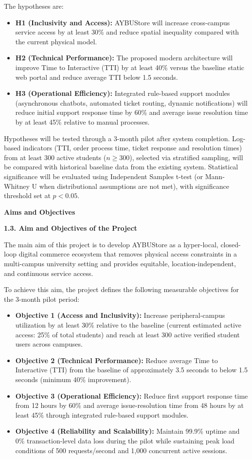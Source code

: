 \documentclass[10pt,a4paper]{article}
\newcommand{\subhead}[1]{\vspace{0.8em}\noindent\textbf{\fontsize{10}{11}\selectfont #1}\par\vspace{0.3em}}
\begin{document}
The hypotheses are:
\begin{itemize}
    \item \textbf{H1 (Inclusivity and Access):} AYBUStore will increase cross-campus service access by at least 30\% and reduce spatial inequality compared with the current physical model.
    \item \textbf{H2 (Technical Performance):} The proposed modern architecture will improve Time to Interactive (TTI) by at least 40\% versus the baseline static web portal and reduce average TTI below 1.5 seconds.
    \item \textbf{H3 (Operational Efficiency):} Integrated rule-based support modules (asynchronous chatbots, automated ticket routing, dynamic notifications) will reduce initial support response time by 60\% and average issue resolution time by at least 45\% relative to manual processes.
\end{itemize}

Hypotheses will be tested through a 3-month pilot after system completion. Log-based indicators (TTI, order process time, ticket response and resolution times) from at least 300 active students ($n \geq 300$), selected via stratified sampling, will be compared with historical baseline data from the existing system. Statistical significance will be evaluated using Independent Samples t-test (or Mann-Whitney U when distributional assumptions are not met), with significance threshold set at $p < 0.05$.

\subhead{Aims and Objectives}
\textbf{1.3. Aim and Objectives of the Project}

The main aim of this project is to develop AYBUStore as a hyper-local, closed-loop digital commerce ecosystem that removes physical access constraints in a multi-campus university setting and provides equitable, location-independent, and continuous service access.

To achieve this aim, the project defines the following measurable objectives for the 3-month pilot period:
\begin{itemize}
    \item \textbf{Objective 1 (Access and Inclusivity):} Increase peripheral-campus utilization by at least 30\% relative to the baseline (current estimated active access: 25\% of total students) and reach at least 300 active verified student users across campuses.
    \item \textbf{Objective 2 (Technical Performance):} Reduce average Time to Interactive (TTI) from the baseline of approximately 3.5 seconds to below 1.5 seconds (minimum 40\% improvement).
    \item \textbf{Objective 3 (Operational Efficiency):} Reduce first support response time from 12 hours by 60\% and average issue-resolution time from 48 hours by at least 45\% through integrated rule-based support modules.
    \item \textbf{Objective 4 (Reliability and Scalability):} Maintain 99.9\% uptime and 0\% transaction-level data loss during the pilot while sustaining peak load conditions of 500 requests/second and 1,000 concurrent active sessions.
\end{itemize}
\end{document}
